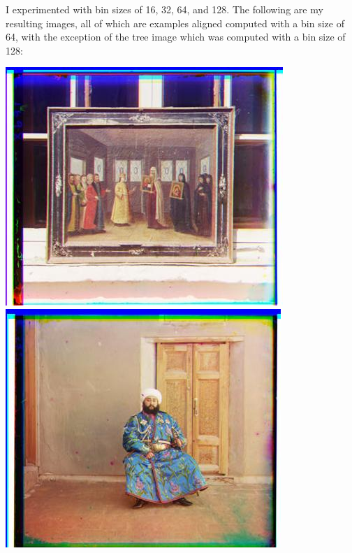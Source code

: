 \documentclass[12pt]{article}
\begin{document}
I experimented with bin sizes of 16, 32, 64, and 128. The following are my resulting images, all of which are examples aligned computed with a bin size of 64, with the exception of the tree image which was computed with a bin size of 128:

\begin{center}
\includegraphics[scale=0.6]{processed/processed-64-00149v.jpg}~
\includegraphics[scale=0.6]{processed/processed-64-00153v.jpg}
\end{center}
\end{document}
